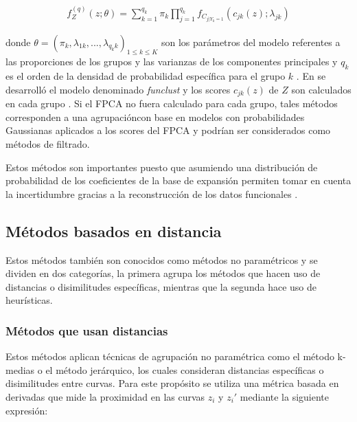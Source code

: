 \documentclass[
]{book}
\begin{document}
\begin{align*}
    f_Z^{(q)}(z;\theta)=\sum_{k=1}^{q_k} \pi_k\prod_{j=1}^{q_k} f_{C_{j{|Y_k=1}}}(c_{jk}(z);\lambda_{jk})
\end{align*}

donde \(\theta=(\pi_{k},\lambda_{1k},...,\lambda_{q_{k}k})_{1\leq k \leq K}\) son los parámetros del modelo referentes a las proporciones de los grupos y las varianzas de los componentes principales y \(q_k\) es el orden de la densidad de probabilidad específica para el grupo \(k\) \citep{Jaque}. En \citep{cristian} se desarrolló el modelo denominado \emph{funclust} y los scores \(c_{jk}(z)\) de \(Z\) son calculados en cada grupo \citep{Jaque}. Si el FPCA no fuera calculado para cada grupo, tales métodos corresponden a una agrupacióncon base en modelos con probabilidades Gaussianas aplicados a los scores del FPCA y podrían ser considerados como métodos de filtrado.

Estos métodos son importantes puesto que asumiendo una distribución de probabilidad de los coeficientes de la base de expansión permiten tomar en cuenta la incertidumbre gracias a la reconstrucción de los datos funcionales \citep{Jaque}.

\hypertarget{muxe9todos-basados-en-distancia}{%
\subsection{Métodos basados en distancia}\label{muxe9todos-basados-en-distancia}}

Estos métodos también son conocidos como métodos no paramétricos y se dividen en dos categorías, la primera agrupa los métodos que hacen uso de distancias o disimilitudes específicas, mientras que la segunda hace uso de heurísticas.

\hypertarget{muxe9todos-que-usan-distancias}{%
\subsubsection*{Métodos que usan distancias}\label{muxe9todos-que-usan-distancias}}

Estos métodos aplican técnicas de agrupación no paramétrica como el método k-medias o el método jerárquico, los cuales consideran distancias específicas o disimilitudes entre curvas. Para este propósito se utiliza una métrica basada en derivadas que mide la proximidad en las curvas \(z_i\) y \(z_i'\) mediante la siguiente expresión:
\end{document}
